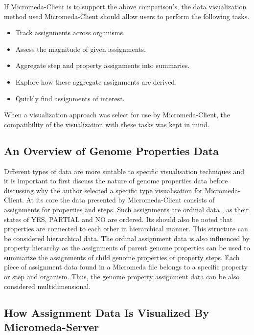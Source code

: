 If Micromeda-Client is to support the above comparison's, the data visualization method used Micromeda-Client should allow users to perform the following tasks.

\begin{itemize}
\item Track assignments across organisms.
\item Assess the magnitude of given assignments.
\item Aggregate step and property assignments into summaries.
\item Explore how these aggregate assignments are derived.
\item Quickly find assignments of interest.
\end{itemize}

When a visualization approach was select for use by Micromeda-Client, the compatibility of the visualization with these tasks was kept in mind.

\subsection{An Overview of Genome Properties Data}

Different types of data are more suitable to specific visualisation techniques and it is important to first discuss the nature of genome properties data before discussing why the author selected a specific type visualisation for Micromeda-Client. At its core the data presented by Micromeda-Client consists of assignments for properties and steps. Such assignments are ordinal data \cite{richardson2018genome,agresti2010analysis}, as their states of YES, PARTIAL and NO are ordered. Its should also be noted that properties are connected to each other in hierarchical manner. This structure can be considered hierarchical data. The ordinal assignment data is also influenced by property hierarchy as the assignments of parent genome properties can be used to summarize the assignments of child genome properties or property steps. Each piece of assignment data found in a Micromeda file belongs to a specific property or step and organism. Thus, the genome property assignment data can be also considered multidimensional.

\subsection{How Assignment Data Is Visualized By Micromeda-Server}

